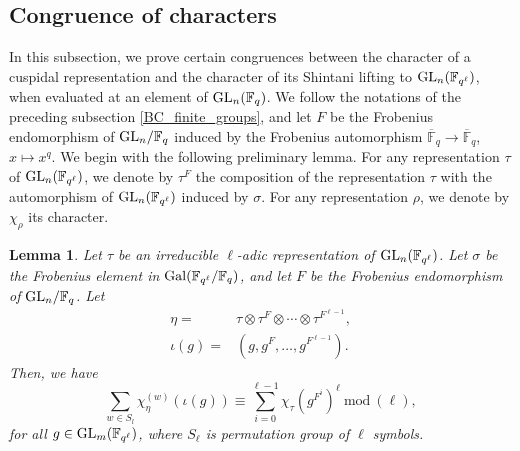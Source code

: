\documentclass[10pt, reqno]{amsart}
\theoremstyle{plain}
\numberwithin{equation}{section} \newcommand{\di}{\operatorname{dim}}
\newtheorem{lemma}[theorem]{Lemma}
\begin{document}
\subsection{Congruence of characters}
In this subsection, we prove certain congruences between the character
of a cuspidal representation and the character of its Shintani lifting
to ${\rm GL}_n(\mathbb{F}_{q^\ell})$, when evaluated at an element of
${\rm GL}_n(\mathbb{F}_q)$. We follow the notations of the preceding
subsection \ref{BC_finite_groups}, and let $F$ be the Frobenius
endomorphism of ${\rm GL}_n/\mathbb{F}_q$ induced by the Frobenius
automorphism
$\overline{\mathbb{F}}_q\rightarrow
\overline{\mathbb{F}}_q$,\,\,$x\mapsto x^q$. We begin with the
following preliminary lemma.  For any representation $\tau$ of
${\rm GL}_n(\mathbb{F}_{q^\ell})$, we denote by $\tau^F$ the
composition of the representation $\tau$ with the automorphism of
${\rm GL}_n(\mathbb{F}_{q^\ell})$ induced by $\sigma$. For any representation
$\rho$, we denote by $\chi_\rho$ its character. 
\begin{lemma}\label{char_iden_2}
  Let $\tau$ be an irreducible $\ell$-adic representation of
  ${\rm GL}_n(\mathbb{F}_{q^\ell})$. Let $\sigma$ be the Frobenius
  element in ${\rm Gal}(\mathbb{F}_{q^\ell}/\mathbb{F}_q)$, and let
  $F$ be the Frobenius endomorphism of ${\rm GL}_n/\mathbb{F}_q$.  Let
\begin{align*}
\eta=&\tau\otimes\tau^F\otimes \cdots\otimes
\tau^{F^{\ell-1}},\\
\iota(g)=& (g, g^F,\dots, g^{F^{\ell-1}}).
\end{align*} 
Then, we have
$$ \sum_{w\in S_l} 
\chi^{(w)}_\eta(\iota(g))
\equiv \sum_{i=0}^{\ell-1}
\chi_\tau(g^{F^i})^\ell\ \text{mod}\ (\ell),$$ for all
$g\in {\rm GL}_m(\mathbb{F}_{q^\ell})$, where $S_\ell$ is permutation group
of $\ell$ symbols.
\end{lemma}
\end{document}
